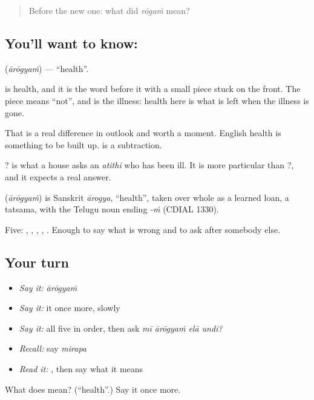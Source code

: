 \label{lesson:TE-C63-health}



\begin{quote}
Before the new one: what did \emph{rōgaṁ} mean?
\end{quote}

\subsection*{You'll want to know: }
\textbf{} (\emph{ārōgyaṁ}) — \textquotedblleft{}health\textquotedblright{}.

 is health, and it is the word before it with a small piece stuck on the front. The piece means \textquotedblleft{}not\textquotedblright{}, and  is the illness: health here is what is left when the illness is gone.

That is a real difference in outlook and worth a moment. English health is something to be built up.  is a subtraction.

   ? is what a house asks an \emph{atithi} who has been ill. It is more particular than   ?, and it expects a real answer.

\begin{cousinweb}
\textbf{} (\emph{ārōgyaṁ}) is Sanskrit \emph{ārogya}, \textquotedblleft{}health\textquotedblright{}, taken over whole as a learned loan, a tatsama, with the Telugu noun ending \emph{-ṁ} (CDIAL 1330).
\end{cousinweb}

\begin{grammarlens}[title={What you've built}]
Five: , , , , . Enough to say what is wrong and to ask after somebody else.
\end{grammarlens}

\subsection*{Your turn}
\begin{itemize}
\raggedright
  \item \emph{Say it:} \emph{ārōgyaṁ}
  \item \emph{Say it:} it once more, slowly
  \item \emph{Say it:} all five in order, then ask \emph{mī ārōgyaṁ elā undi?}
  \item \emph{Recall:} say \emph{mirapa}
  \item \emph{Read it:} \textbf{}, then say what it means
\end{itemize}

\begin{tcolorbox}[breakable,colback=teal!4,colframe=teal!35!black,title={Before you move on}]
What does  mean? (\textquotedblleft{}health\textquotedblright{}.) Say it once more.
\end{tcolorbox}
